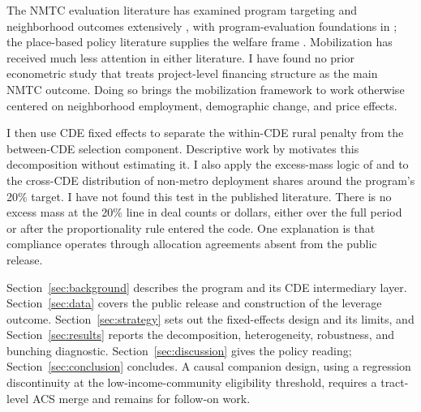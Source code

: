 The NMTC evaluation literature has examined program targeting and
neighborhood outcomes extensively
\citep{gurley2009, freedman2012, hargerross2016, freedmankuhns2018,
theodos2020, theodos2022, corinth2024}, with program-evaluation
foundations in \citet{abravanel2013}; the place-based policy literature
supplies the welfare frame \citep{glaesergottlieb2008, klinemoretti2014,
neumarksimpson2015, diamondmcquade2019}. Mobilization has received much less
attention in either literature. I have found no prior econometric study
that treats project-level financing structure as the main NMTC outcome.
Doing so brings the mobilization framework to work otherwise centered on
neighborhood employment, demographic change, and price effects.

I then use CDE fixed effects to separate the within-CDE rural penalty from
the between-CDE selection component. Descriptive work by
\citet{theodos2021} motivates this decomposition without estimating it. I
also apply the excess-mass logic of \citet{chetty2011} and
\citet{kleven2016} to the cross-CDE distribution of non-metro deployment
shares around the program's 20\% target. I have not found this test in the
published literature. There is no excess mass at the 20\% line in deal
counts or dollars, either over the full period or after the proportionality
rule entered the code. One explanation is that compliance operates through
allocation agreements absent from the public release.

Section~\ref{sec:background} describes the program and its CDE intermediary
layer. Section~\ref{sec:data} covers the public release and construction of
the leverage outcome. Section~\ref{sec:strategy} sets out the fixed-effects
design and its limits, and Section~\ref{sec:results} reports the
decomposition, heterogeneity, robustness, and bunching diagnostic.
Section~\ref{sec:discussion} gives the policy reading;
Section~\ref{sec:conclusion} concludes. A causal companion design, using a
regression discontinuity at the low-income-community eligibility threshold,
requires a tract-level ACS merge and remains for follow-on work.
